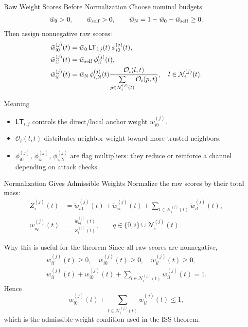\documentclass[aspectratio=169,10pt]{beamer}
\newcommand{\LT}{\mathsf{LT}}
\providecommand{\O}{}
\renewcommand{\O}{\mathcal{O}}
\begin{document}
\begin{frame}{Raw Weight Scores Before Normalization}
\scriptsize
Choose nominal budgets
\[
\bar w_0>0,\qquad \bar w_{\rm self}>0,\qquad
\bar w_{\rm N}=1-\bar w_0-\bar w_{\rm self}\ge0.
\]
Then assign nonnegative raw scores:
\begin{align*}
\tilde{w}_{i0}^{(j)}(t)
&=\bar w_0\,\LT_{i,j}(t)\,\phi_{i0}^{(j)}(t),\\
\tilde{w}_{ii}^{(j)}(t)
&=\bar w_{\rm self}\,\phi_{ii}^{(j)}(t),\\
\tilde{w}_{il}^{(j)}(t)
&=\bar w_{\rm N}\,\phi_{i,\mathrm{N}}^{(j)}(t)
\frac{\O_i(l,t)}
{\sum\limits_{p\in\mathcal{N}_{i}^{(j)}(t)}\O_i(p,t)},
\quad l\in\mathcal{N}_{i}^{(j)}(t).
\end{align*}

\begin{block}{Meaning}
\begin{itemize}
\item $\LT_{i,j}$ controls the direct/local anchor weight $w_{i0}^{(j)}$.
\item $\O_i(l,t)$ distributes neighbor weight toward more trusted neighbors.
\item $\phi_{i0}^{(j)}$, $\phi_{ii}^{(j)}$, $\phi_{i,\mathrm{N}}^{(j)}$ are flag multipliers: they reduce or reinforce a channel depending on attack checks.
\end{itemize}
\end{block}
\end{frame}

\begin{frame}{Normalization Gives Admissible Weights}
\footnotesize
Normalize the raw scores by their total mass:
\[
\begin{aligned}
Z_i^{(j)}(t)
&=\tilde{w}_{i0}^{(j)}(t)+\tilde{w}_{ii}^{(j)}(t)+
\sum_{l\in\mathcal{N}_{i}^{(j)}(t)}\tilde{w}_{il}^{(j)}(t),\\
w_{iq}^{(j)}(t)
&=\frac{\tilde{w}_{iq}^{(j)}(t)}{Z_i^{(j)}(t)},\qquad
q\in\{0,i\}\cup\mathcal{N}_{i}^{(j)}(t).
\end{aligned}
\]

\begin{block}{Why this is useful for the theorem}
Since all raw scores are nonnegative,
\[
\begin{gathered}
w_{ii}^{(j)}(t)\ge0,\quad w_{i0}^{(j)}(t)\ge0,\quad
w_{il}^{(j)}(t)\ge0,\\
w_{ii}^{(j)}(t)+w_{i0}^{(j)}(t)+
\sum_{l\in\mathcal{N}_{i}^{(j)}(t)}w_{il}^{(j)}(t)=1.
\end{gathered}
\]
Hence
\[
w_{i0}^{(j)}(t)+
\sum_{l\in\mathcal{N}_{i}^{(j)}(t)}w_{il}^{(j)}(t)\le1,
\]
which is the admissible-weight condition used in the ISS theorem.
\end{block}
\end{frame}
\end{document}
